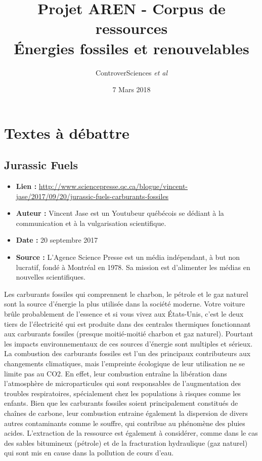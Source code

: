 \documentclass[8pt]{article}
\author{ControverSciences\textit{ et al} }
\title{Projet AREN - Corpus de ressources \\  Énergies fossiles et renouvelables}
\date{7 Mars 2018}
\begin{document}
\maketitle

\tableofcontents

\newpage
\section{Textes à débattre}

\subsection{Jurassic Fuels}
\begin{itemize}
	\item \textbf{Lien : }  \url{http://www.sciencepresse.qc.ca/blogue/vincent-jase/2017/09/20/jurassic-fuels-carburants-fossiles} 
	\item \textbf{Auteur : } Vincent Jase est un Youtubeur québécois se dédiant à la communication et à la vulgarisation scientifique.
	\item \textbf{Date : }  20 septembre 2017
	\item \textbf{Source : }  L'Agence Science Presse est un média indépendant, à but non lucratif, fondé à Montréal en 1978. Sa mission est d’alimenter les médias en nouvelles scientifiques. 
\end{itemize}

Les carburants fossiles qui comprennent le charbon, le pétrole et le gaz naturel sont la source d’énergie la plus utilisée dans la société moderne. Votre voiture brûle probablement de l’essence et si vous vivez aux États-Unis, c’est le deux tiers de l’électricité qui est produite dans des centrales thermiques fonctionnant aux carburants fossiles (presque moitié-moitié charbon et gaz naturel). Pourtant les impacts environnementaux de ces sources d’énergie sont multiples et sérieux.\\

La combustion des carburants fossiles est l’un des principaux contributeurs aux changements climatiques, mais l’empreinte écologique de leur utilisation ne se limite pas au CO2. En effet, leur combustion entraîne la libération dans l’atmosphère de microparticules qui sont responsables de l’augmentation des troubles respiratoires, spécialement chez les populations à risques comme les enfants. Bien que les carburants fossiles soient principalement constitués de chaînes de carbone, leur combustion entraine également la dispersion de divers autres contaminants comme le souffre, qui contribue au phénomène des pluies acides. L’extraction de la ressource est également à considérer, comme dans le cas des sables bitumineux (pétrole) et de la fracturation hydraulique (gaz naturel) qui sont mis en cause dans la pollution de cours d’eau.\\
\end{document}
